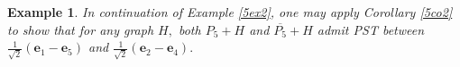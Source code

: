\documentclass[12pt,a4paper]{article}
\newtheorem{cor}{Corollary}
\newtheorem{exm}{Example}
\def \e {{\bf e}}
\def \u {{\bf u}}
\def \v {{\bf v}}
\def \e {{\mathbf e}}
\newcommand{\ob}[1]{\left(#1\right)}
\begin{document}
\begin{exm} In continuation of  Example \ref{5ex2}, one may apply Corollary \ref{5co2} to show that for any graph $H,$ both $P_5+H$ and $\overline{P_5}+H$ admit PST between $\frac{1}{\sqrt{2}}(\e_1-\e_5)$ and $\frac{1}{\sqrt{2}}(\e_2-\e_4).$  
\end{exm}
 
 
\end{document}
